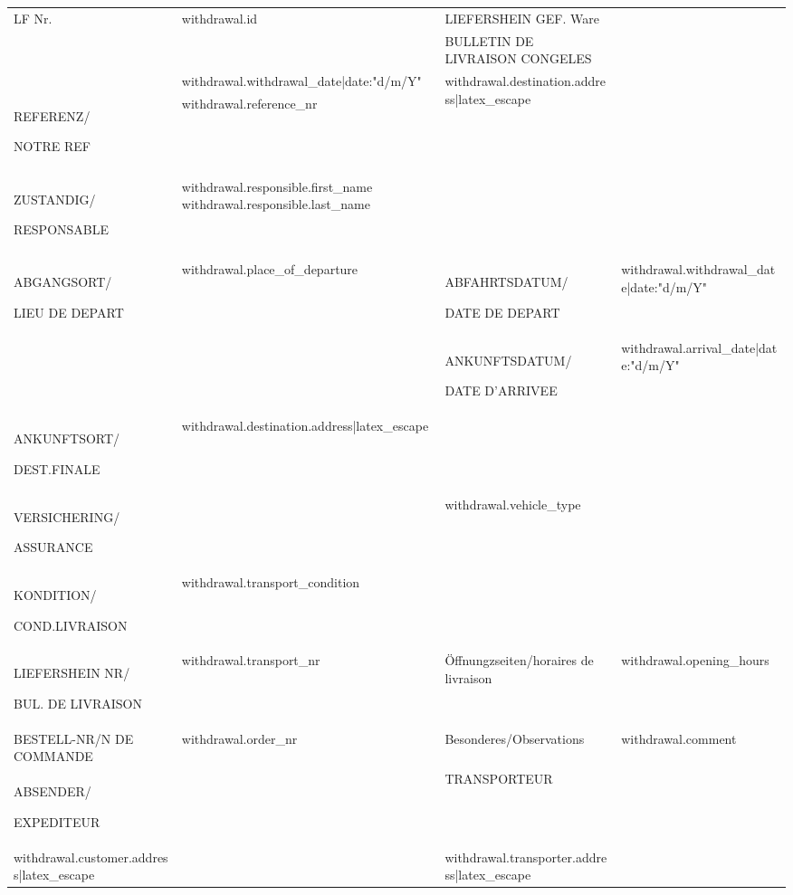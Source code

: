 \documentclass[english, a4paper]{article}
\begin{document}
  \begin{small}
    \begin{longtable}{p{120pt}p{120pt}p{120pt}p{120pt}}
      LF Nr. &
      {{ withdrawal.id }} &
      LIEFERSHEIN GEF. Ware &
    \tabularnewline
      &
      &
      BULLETIN DE LIVRAISON CONGELES &
    \tabularnewline
      &
      {{ withdrawal.withdrawal_date|date:"d/m/Y" }} &
      \multirow{4}{120pt}{ {{ withdrawal.destination.address|latex_escape }} } &
    \tabularnewline
      REFERENZ/


      NOTRE REF &
      {{ withdrawal.reference_nr }} &
      &
    \tabularnewline
      &
      &
      &      
    \tabularnewline
      ZUSTANDIG/


      RESPONSABLE &
      {{ withdrawal.responsible.first_name }} {{ withdrawal.responsible.last_name }} &
      &
    \tabularnewline
      &
      &
      &      
    \tabularnewline
      ABGANGSORT/


      LIEU DE DEPART &
      {{ withdrawal.place_of_departure }} &
      ABFAHRTSDATUM/


      DATE DE DEPART &
      {{ withdrawal.withdrawal_date|date:"d/m/Y" }}
    \tabularnewline
      &
      &
      ANKUNFTSDATUM/


      DATE D'ARRIVEE &
      {{ withdrawal.arrival_date|date:"d/m/Y" }}
    \tabularnewline
      ANKUNFTSORT/


      DEST.FINALE &
      {{ withdrawal.destination.address|latex_escape }} &
      &
    \tabularnewline
      VERSICHERING/


      ASSURANCE &
      {%
      TRANSPORTMITTEL/


      MOYEN TRANSPORT &
      {{ withdrawal.vehicle_type }}
    \tabularnewline
      KONDITION/


      COND.LIVRAISON &
      {{ withdrawal.transport_condition }} &
      &
    \tabularnewline
      LIEFERSHEIN NR/


      BUL. DE LIVRAISON &
      {{ withdrawal.transport_nr }} &
      Öffnungzseiten/horaires de livraison &
      {{ withdrawal.opening_hours }}
    \tabularnewline
      BESTELL-NR/N\textdegree{} DE COMMANDE &
      {{ withdrawal.order_nr }} &
      Besonderes/Observations &
      {{ withdrawal.comment }}
    \tabularnewline
      ABSENDER/


      EXPEDITEUR &
      &
      TRANSPORTEUR &
    \tabularnewline
      {{ withdrawal.customer.address|latex_escape }} &
      &
      {{ withdrawal.transporter.address|latex_escape }} &
    \end{longtable}
  \end{small}
\end{document}

